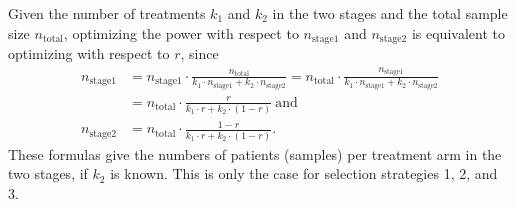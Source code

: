 \documentclass[bimj,fleqn]{w-art}
\theoremstyle{plain}
\theoremstyle{definition}
\begin{document}
Given the number of treatments $k_1$ and $k_2$ in the two stages and the total sample size $n_{\text{total}}$, optimizing the power with respect to $n_{\text{stage1}}$ and $n_{\text{stage2}}$ is equivalent to optimizing with respect to $r$, since
\begin{align}
  \label{eq:stagec}
  n_{\text{stage1}} & = 
  n_{\text{stage1}}\cdot \frac{n_{\text{total}}}{k_1\cdot n_{\text{stage1}}+k_2\cdot n_{\text{stage2}}} = 
  n_{\text{total}} \cdot \frac{n_{\text{stage1}}}{k_1\cdot n_{\text{stage1}}+k_2\cdot n_{\text{stage2}}} \nonumber \\
  & = n_{\text{total}}\cdot
  \frac{r}{k_1\cdot
  r+k_2\cdot (1-r)} \ \text{and} \nonumber \\
  n_{\text{stage2}} & =
  n_{\text{total}}\cdot
  \frac{1-r}{k_1\cdot
  r+k_2\cdot (1-r)}.
\end{align}
These formulas give the numbers of patients (samples) per treatment arm in the two stages, if $k_2$ is known. 
This is only the case for selection strategies 1, 2, and 3.
\end{document}
